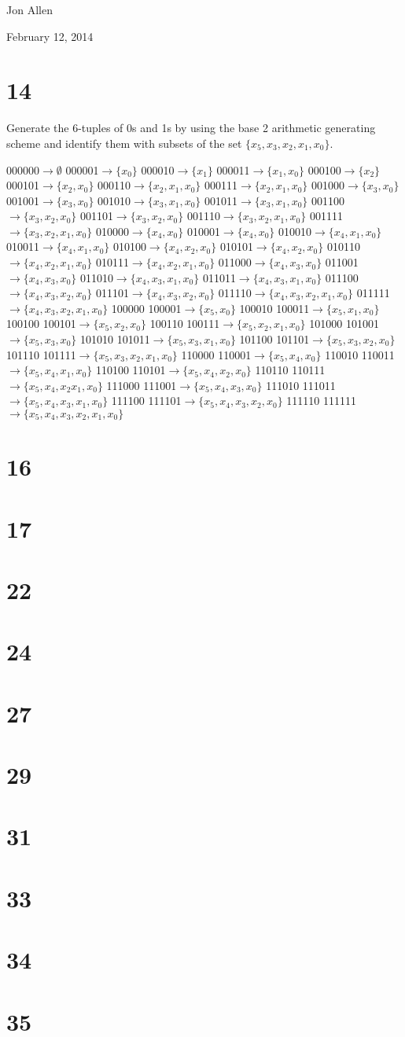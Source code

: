 \documentclass{article}
\begin{document}
Jon Allen

February 12, 2014

\section*{14}
Generate the 6-tuples of 0s and 1s by using the base 2 arithmetic generating scheme and identify them with subsets of the set $\{x_5,x_3,x_2,x_1,x_0\}$.

000000$\to\emptyset$ 000001$\to\{x_0\}$
000010$\to\{x_1\}$ 000011$\to\{x_1,x_0\}$
000100$\to\{x_2\}$ 000101$\to\{x_2,x_0\}$
000110$\to\{x_2,x_1,x_0\}$ 000111$\to\{x_2,x_1,x_0\}$
001000$\to\{x_3,x_0\}$ 001001$\to\{x_3,x_0\}$
001010$\to\{x_3,x_1,x_0\}$ 001011$\to\{x_3,x_1,x_0\}$
001100$\to\{x_3,x_2,x_0\}$ 001101$\to\{x_3,x_2,x_0\}$
001110$\to\{x_3,x_2,x_1,x_0\}$ 001111$\to\{x_3,x_2,x_1,x_0\}$
010000$\to\{x_4,x_0\}$ 010001$\to\{x_4,x_0\}$
010010$\to\{x_4,x_1,x_0\}$ 010011$\to\{x_4,x_1,x_0\}$
010100$\to\{x_4,x_2,x_0\}$ 010101$\to\{x_4,x_2,x_0\}$
010110$\to\{x_4,x_2,x_1,x_0\}$ 010111$\to\{x_4,x_2,x_1,x_0\}$
011000$\to\{x_4,x_3,x_0\}$ 011001$\to\{x_4,x_3,x_0\}$
011010$\to\{x_4,x_3,x_1,x_0\}$ 011011$\to\{x_4,x_3,x_1,x_0\}$
011100$\to\{x_4,x_3,x_2,x_0\}$ 011101$\to\{x_4,x_3,x_2,x_0\}$
011110$\to\{x_4,x_3,x_2,x_1,x_0\}$ 011111$\to\{x_4,x_3,x_2,x_1,x_0\}$
100000 100001$\to\{x_5,x_0\}$
100010 100011$\to\{x_5,x_1,x_0\}$
100100 100101$\to\{x_5,x_2,x_0\}$
100110 100111$\to\{x_5,x_2,x_1,x_0\}$
101000 101001$\to\{x_5,x_3,x_0\}$
101010 101011$\to\{x_5,x_3,x_1,x_0\}$
101100 101101$\to\{x_5,x_3,x_2,x_0\}$
101110 101111$\to\{x_5,x_3,x_2,x_1,x_0\}$
110000 110001$\to\{x_5,x_4,x_0\}$
110010 110011$\to\{x_5,x_4,x_1,x_0\}$
110100 110101$\to\{x_5,x_4,x_2,x_0\}$
110110 110111$\to\{x_5,x_4,x_2x_1,x_0\}$
111000 111001$\to\{x_5,x_4,x_3,x_0\}$
111010 111011$\to\{x_5,x_4,x_3,x_1,x_0\}$
111100 111101$\to\{x_5,x_4,x_3,x_2,x_0\}$
111110 111111$\to\{x_5,x_4,x_3,x_2,x_1,x_0\}$
\section*{16}
\section*{17}
\section*{22}
\section*{24}
\section*{27}
\section*{29}
\section*{31}
\section*{33}
\section*{34}
\section*{35}
\end{document}
